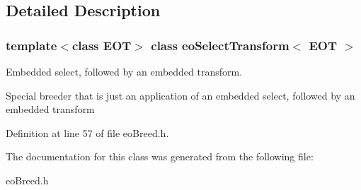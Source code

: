 \subsection{Detailed Description}
\subsubsection*{template$<$class EOT$>$ class eo\-Select\-Transform$<$ EOT $>$}

Embedded select, followed by an embedded transform. 

Special breeder that is just an application of an embedded select, followed by an embedded transform 



Definition at line 57 of file eo\-Breed.h.

The documentation for this class was generated from the following file:\begin{CompactItemize}
\item 
eo\-Breed.h\end{CompactItemize}
